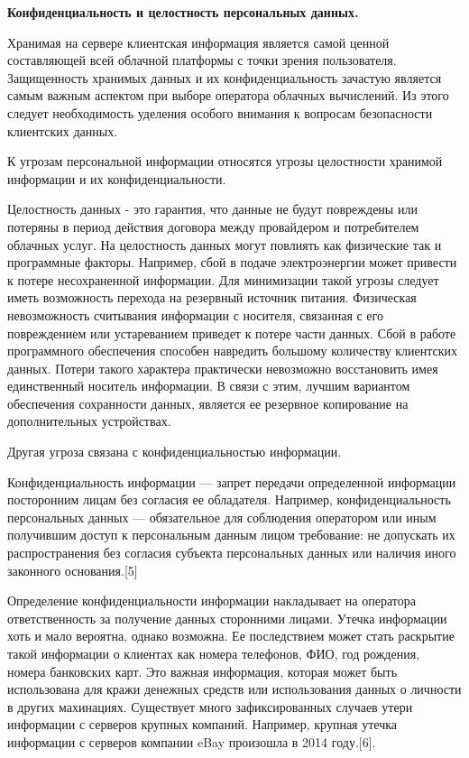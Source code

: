 \textbf{Конфиденциальность и целостность персональных данных.}

Хранимая на сервере клиентская информация является самой ценной составляющей  всей облачной платформы с точки зрения пользователя. Защищенность хранимых данных и их конфиденциальность зачастую является самым важным аспектом при выборе оператора облачных вычислений. Из этого следует необходимость уделения особого внимания к вопросам безопасности клиентских данных.

К угрозам персональной информации относятся угрозы целостности хранимой информации и их конфиденциальности.

Целостность данных - это гарантия, что данные не будут повреждены или потеряны в период действия договора между провайдером и потребителем облачных услуг. На целостность данных могут повлиять как физические так и программные факторы. Например, сбой в подаче электроэнергии может привести к потере несохраненной информации. Для минимизации такой угрозы следует иметь возможность перехода на резервный источник питания. Физическая невозможность считывания информации с носителя, связанная с его повреждением или устареванием приведет к потере части данных. Сбой в работе программного обеспечения способен навредить большому количеству клиентских данных. Потери такого характера практически невозможно восстановить имея единственный носитель информации. В связи с этим, лучшим вариантом обеспечения сохранности данных, является ее резервное копирование на дополнительных устройствах.

Другая угроза связана с конфиденциальностью информации.

Конфиденциальность информации — запрет передачи определенной информации посторонним  лицам без согласия ее обладателя. Например, конфиденциальность персональных данных — обязательное для соблюдения оператором или иным получившим доступ к персональным данным лицом требование: не допускать их распространения без согласия субъекта персональных данных или наличия иного законного основания.[5]

Определение конфиденциальности информации накладывает на оператора ответственность за получение данных сторонними лицами. Утечка информации хоть и мало вероятна, однако возможна. Ее последствием может стать раскрытие такой информации о клиентах как номера телефонов, ФИО, год рождения, номера банковских карт. Это важная информация, которая может быть использована для кражи денежных средств или использования данных о личности в других махинациях. Существует много зафиксированных случаев утери информации с серверов крупных компаний. Например, крупная утечка информации с серверов компании eBay произошла в 2014 году.[6].

